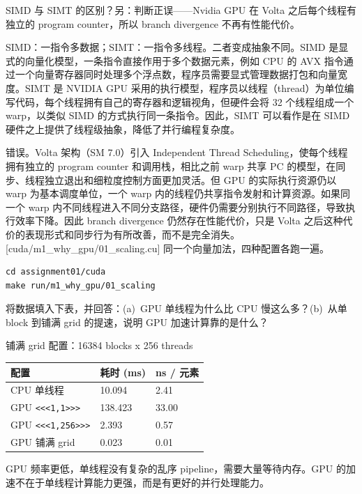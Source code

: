 \documentclass[11pt,a4paper,fontset=none]{ctexart}
\begin{document}
SIMD 与 SIMT 的区别？另：判断正误——Nvidia GPU 在 Volta 之后每个线程有独立的 program counter，所以 branch divergence 不再有性能代价。

SIMD：一指令多数据；SIMT：一指令多线程。二者变成抽象不同。SIMD 是显式的向量化模型，一条指令直接作用于多个数据元素，例如 CPU 的 AVX 指令通过一个向量寄存器同时处理多个浮点数，程序员需要显式管理数据打包和向量宽度。SIMT 是 NVIDIA GPU 采用的执行模型，程序员以线程（thread）为单位编写代码，每个线程拥有自己的寄存器和逻辑视角，但硬件会将 32 个线程组成一个 warp，以类似 SIMD 的方式执行同一条指令。因此，SIMT 可以看作是在 SIMD 硬件之上提供了线程级抽象，降低了并行编程复杂度。

错误。Volta 架构（SM 7.0）引入 Independent Thread Scheduling，使每个线程拥有独立的 program counter 和调用栈，相比之前 warp 共享 PC 的模型，在同步、线程独立退出和细粒度控制方面更加灵活。但 GPU 的实际执行资源仍以 warp 为基本调度单位，一个 warp 内的线程仍共享指令发射和计算资源。如果同一个 warp 内不同线程进入不同分支路径，硬件仍需要分别执行不同路径，导致执行效率下降。因此 branch divergence 仍然存在性能代价，只是 Volta 之后这种代价的表现形式和同步行为有所改善，而不是完全消失。
[cuda/m1\_why\_gpu/01\_scaling.cu]
同一个向量加法，四种配置各跑一遍。

\begin{lstlisting}
cd assignment01/cuda
make run/m1_why_gpu/01_scaling
\end{lstlisting}

将数据填入下表，并回答：(a)~GPU 单线程为什么比 CPU 慢这么多？(b)~从单 block 到铺满 grid 的提速，说明 GPU 加速计算靠的是什么？

铺满 grid 配置：16384 blocks x 256 threads

\begin{center}\small
  \begin{tabular}{@{}lll@{}}
    \toprule
    配置                       & 耗时 (ms) & ns / 元素 \\
    \midrule
    CPU 单线程                  & 10.094  & 2.41    \\
    GPU \texttt{<<<1,1>>>}   & 138.423 & 33.00   \\
    GPU \texttt{<<<1,256>>>} & 2.393   & 0.57    \\
    GPU 铺满 grid              & 0.023   & 0.01    \\
    \bottomrule
  \end{tabular}
\end{center}

GPU 频率更低，单线程没有复杂的乱序 pipeline，需要大量等待内存。GPU 的加速不在于单线程计算能力更强，而是有更好的并行处理能力。
\end{document}
